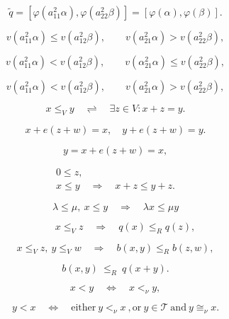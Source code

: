 \documentclass{article}
\begin{document}
$${\tilde q}=[{\varphi}(a_{11}^2{\alpha}),{\varphi}(a_{22}^2{\beta})]=[{\varphi}({\alpha}),{\varphi}({\beta})].$$

$$v(a_{11}^2{\alpha})\le v(a_{12}^2{\beta}),\qquad v(a_{21}^2{\alpha})>v(a_{22}^2{\beta}),$$

$$v(a_{11}^2{\alpha})<v(a_{12}^2{\beta}),\qquad v({\alpha}_{21}^2{\alpha})\le v(a_{22}^2{\beta}),$$

$$v(a_{11}^2{\alpha})<v(a_{12}^2{\beta}),\qquad v(a_{21}^2{\alpha})>v(a_{22}^2{\beta}),$$

\begin{equation}\label{eq:I.6.1}
x\le_Vy {\quad {\rightleftharpoons} \quad }\exists z\in V: x+z=y.
\end{equation}

$$x+e(z+w)=x,\quad y+e(z+w)=y.$$

$$y=x+e(z+w)=x,$$

\begin{gather}
 0\le z,\label{eq:I.6.2}\\
 x\le y {\quad {\Rightarrow} \quad } x+z\le y+z.\label{eq:I.6.3}
 \end{gather}

\begin{equation}\label{eq:I.6.4}
{\lambda} \le\mu,\ x\le y{\quad {\Rightarrow} \quad } {\lambda}  x\le \mu y
\end{equation}

\begin{equation}\label{eq:I.6.5}
\qquad x\le _V z {\quad {\Rightarrow} \quad } q(x)\le_R q(z),\end{equation}

\begin{equation}\label{eq:I.6.6}
x\le _V z,\ y\le_V w{\quad {\Rightarrow} \quad } b(x,y)\le_R b(z,w),\end{equation}

\begin{equation}\label{eq:I.6.7}
b(x,y) {\ {{\le_R}} \ }  q(x+y).\end{equation}

\begin{equation}\label{eq:I.6.8}
x<y {\quad {\Leftrightarrow} \quad } x<_\nu y,\end{equation}

\begin{equation}\label{eq:I.6.9}
y<x {\quad {\Leftrightarrow} \quad } \text{either}\ y<_\nu x\ ,  \text{or}\ y\in{\mathcal T}\ \text{and}\ y\cong_\nu x.\end{equation}
\end{document}
